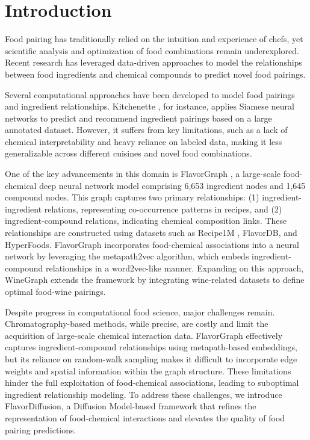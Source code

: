 \section{Introduction}
Food pairing has traditionally relied on the intuition and experience of chefs, yet scientific analysis and optimization of food combinations remain underexplored. Recent research has leveraged data-driven approaches to model the relationships between food ingredients and chemical compounds to predict novel food pairings.

Several computational approaches have been developed to model food pairings and ingredient relationships. {Kitchenette} \cite{Park2019}, for instance, applies Siamese neural networks to predict and recommend ingredient pairings based on a large annotated dataset. However, it suffers from key limitations, such as a lack of chemical interpretability and heavy reliance on labeled data, making it less generalizable across different cuisines and novel food combinations.

One of the key advancements in this domain is {FlavorGraph} \cite{Park2019}, a large-scale food-chemical deep neural network model comprising {6,653 ingredient nodes} and {1,645 compound nodes}. This graph captures two primary relationships: (1) {ingredient-ingredient relations}, representing co-occurrence patterns in recipes, and (2) {ingredient-compound relations}, indicating chemical composition links. These relationships are constructed using datasets such as {Recipe1M} \cite{Marin2019}, {FlavorDB}, and {HyperFoods}. {FlavorGraph} incorporates food-chemical associations into a neural network by leveraging the {metapath2vec} \cite{Dong2017} algorithm, which embeds ingredient-compound relationships in a word2vec-like manner. Expanding on this approach, {WineGraph} \cite{Gawrysiak2023} extends the framework by integrating wine-related datasets to define optimal food-wine pairings.

Despite progress in computational food science, major challenges remain. Chromatography-based methods, while precise, are costly and limit the acquisition of large-scale chemical interaction data. {FlavorGraph} effectively captures ingredient-compound relationships using {metapath-based embeddings}, but its reliance on {random-walk sampling} makes it difficult to incorporate edge weights and spatial information within the graph structure. These limitations hinder the full exploitation of food-chemical associations, leading to suboptimal ingredient relationship modeling. To address these challenges, we introduce {FlavorDiffusion}, a Diffusion Model-based framework that refines the representation of food-chemical interactions and elevates the quality of food pairing predictions.

